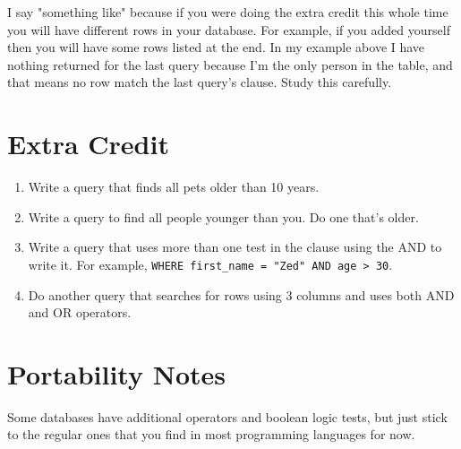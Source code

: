 I say "something like" because if you were doing the extra credit this
whole time you will have different rows in your database.  For example,
if you added yourself then you will have some rows listed at the end.  In
my example above I have nothing returned for the last query because I'm
the only person in the  table, and that means no row
match the last query's  clause.  Study this carefully.

\section{Extra Credit}

\begin{enumerate}
\item Write a query that finds all pets older than 10 years.
\item Write a query to find all people younger than you.  Do one that's older.
\item Write a query that uses more than one test in the  clause using
    the AND to write it.  For example, \verb|WHERE first_name = "Zed" AND age > 30|.
\item Do another query that searches for rows using 3 columns and uses both AND
    and OR operators.
\end{enumerate}

\section{Portability Notes}

Some databases have additional operators and boolean logic tests, but just
stick to the regular ones that you find in most programming languages for now.

